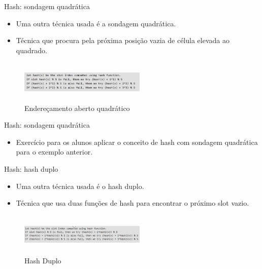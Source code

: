 \begin{frame}
	\begin{block}{Hash: sondagem quadrática}
		\begin{itemize}
			\item Uma outra técnica usada é a sondagem quadrática. 

			\item Técnica que procura pela próxima posição vazia de célula elevada ao quadrado.
		\end{itemize}
				\begin{figure}[!htb]
			\centering	  				
			\includegraphics[height=2cm, width = 6cm]{./pic/quadratic.jpg}
			\caption{Endereçamento aberto quadrático  \cite{GEEKS_2018}}
		\end{figure}
	\end{block}
\end{frame}

\begin{frame}
	\begin{block}{Hash: sondagem quadrática}
		\begin{itemize}
			\item Exercício para os alunos aplicar o conceito de hash com sondagem quadrática para o exemplo anterior.
		\end{itemize}
	\end{block}
\end{frame}


\begin{frame}
	\begin{block}{Hash: hash duplo}
		\begin{itemize}
			\item Uma outra técnica usada é o hash duplo. 

			\item Técnica que usa duas funções de hash para encontrar o próximo slot vazio.
		\end{itemize}
				\begin{figure}[!htb]
			\centering	  				
			\includegraphics[height=2cm, width = 6cm]{./pic/doubleHash.jpg}
			\caption{Hash Duplo  \cite{GEEKS_2018}}
		\end{figure}
	\end{block}
\end{frame}



